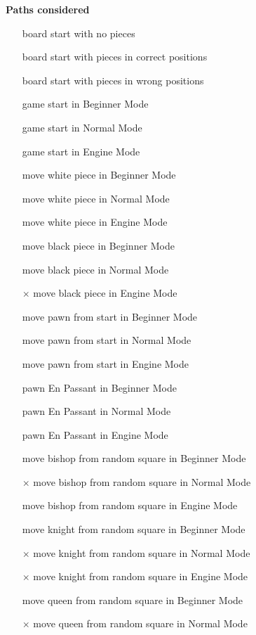 \documentclass[12pt, titlepage]{article}
\begin{document}
\bf{Paths considered}
\begin{itemize}
  \item[\checkmark] board start with no pieces
  \item[\checkmark] board start with pieces in correct positions
  \item[\checkmark] board start with pieces in wrong positions
  \item[\checkmark] game start in Beginner Mode
  \item[\checkmark] game start in Normal Mode
  \item[\checkmark] game start in Engine Mode
  \item[\checkmark] move white piece in Beginner Mode
  \item[\checkmark] move white piece in Normal Mode
  \item[\checkmark] move white piece in Engine Mode
  \item[\checkmark] move black piece in Beginner Mode
  \item[\checkmark] move black piece in Normal Mode
  \item[$\times$] move black piece in Engine Mode
  \item[\checkmark] move pawn from start in Beginner Mode
  \item[\checkmark] move pawn from start in Normal Mode
  \item[\checkmark] move pawn from start in Engine Mode
  \item[\checkmark] pawn En Passant in Beginner Mode
  \item[\checkmark] pawn En Passant in Normal Mode
  \item[\checkmark] pawn En Passant in Engine Mode
  \item[\checkmark] move bishop from random square in Beginner Mode
  \item[$\times$] move bishop from random square in Normal Mode
  \item[\checkmark] move bishop from random square in Engine Mode
  \item[\checkmark] move knight from random square in Beginner Mode
  \item[$\times$] move knight from random square in Normal Mode
  \item[$\times$] move knight from random square in Engine Mode
  \item[\checkmark] move queen from random square in Beginner Mode
  \item[$\times$] move queen from random square in Normal Mode

\end{itemize}
\end{document}
